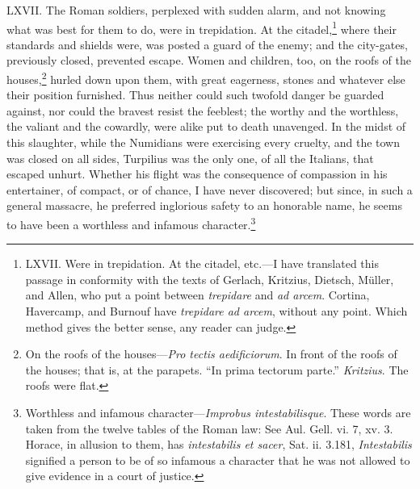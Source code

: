 LXVII. The Roman soldiers, perplexed with sudden alarm, and not
knowing what was best for them to do, were in trepidation. At the
citadel,\footnote{LXVII. Were in trepidation. At the citadel, etc.—I have
translated this passage in conformity with the texts of Gerlach,
Kritzius, Dietsch, Müller, and Allen, who put a point between
\emph{trepidare} and \emph{ad arcem}. Cortina, Havercamp, and Burnouf have
\emph{trepidare ad arcem}, without any point. Which method gives the better
sense, any reader can judge.} where their standards and shields were, was posted a
guard of the enemy; and the city-gates, previously closed, prevented
escape. Women and children, too, on the roofs of the houses,\footnote{On the roofs of the houses—\emph{Pro tectis aedificiorum}. In
front of the roofs of the houses; that is, at the parapets. ``In prima
tectorum parte.'' \emph{Kritzius}. The roofs were flat.}
hurled down upon them, with great eagerness, stones and whatever else
their position furnished. Thus neither could such twofold danger be
guarded against, nor could the bravest resist the feeblest; the worthy
and the worthless, the valiant and the cowardly, were alike put to
death unavenged. In the midst of this slaughter, while the Numidians
were exercising every cruelty, and the town was closed on all sides,
Turpilius was the only one, of all the Italians, that escaped unhurt.
Whether his flight was the consequence of compassion in his entertainer,
of compact, or of chance, I have never discovered; but since, in such a
general massacre, he preferred inglorious safety to an honorable name,
he seems to have been a worthless and infamous character.\footnote{Worthless and infamous character—\emph{Improbus intestabilisque}.
These words are taken from the twelve tables of the Roman law: See
Aul. Gell. vi. 7, xv. 3. Horace, in allusion to them, has \emph{intestabilis
et sacer}, Sat. ii. 3.181, \emph{Intestabilis} signified a person to be of
so infamous a character that he was not allowed to give evidence in a
court of justice.}

